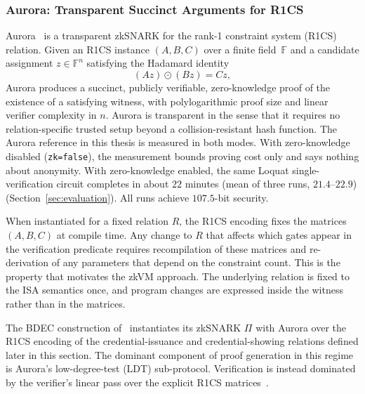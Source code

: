 \subsubsection{Aurora: Transparent Succinct Arguments for R1CS}
Aurora~\cite{cryptoeprint:2018/828} is a transparent zkSNARK for the rank-1 constraint system (R1CS) relation. Given an R1CS instance $(A,B,C)$ over a finite field~$\mathbb{F}$ and a candidate assignment $z\in\mathbb{F}^n$ satisfying the Hadamard identity
\begin{equation*}
  (A z) \odot (B z) = C z,
\end{equation*}
Aurora produces a succinct, publicly verifiable, zero-knowledge proof of the existence of a satisfying witness, with polylogarithmic proof size and linear verifier complexity in $n$. Aurora is transparent in the sense that it requires no relation-specific trusted setup beyond a collision-resistant hash function. The Aurora reference in this thesis is measured in both modes. With zero-knowledge disabled (\texttt{zk=false}), the measurement bounds proving cost only and says nothing about anonymity. With zero-knowledge enabled, the same Loquat single-verification circuit completes in about $22$ minutes (mean of three runs, $21.4$--$22.9$) (Section~\ref{sec:evaluation}). All runs achieve $107.5$-bit security.

When instantiated for a fixed relation $R$, the R1CS encoding fixes the matrices $(A,B,C)$ at compile time. Any change to $R$ that affects which gates appear in the verification predicate requires recompilation of these matrices and re-derivation of any parameters that depend on the constraint count. This is the property that motivates the zkVM approach. The underlying relation is fixed to the ISA semantics once, and program changes are expressed inside the witness rather than in the matrices.

The BDEC construction of~\cite{10.1007/978-981-96-0957-4_3} instantiates its zkSNARK $\Pi$ with Aurora over the R1CS encoding of the credential-issuance and credential-showing relations defined later in this section. The dominant component of proof generation in this regime is Aurora's low-degree-test (LDT) sub-protocol. Verification is instead dominated by the verifier's linear pass over the explicit R1CS matrices~\cite[Thm.~1.2]{cryptoeprint:2018/828}.

